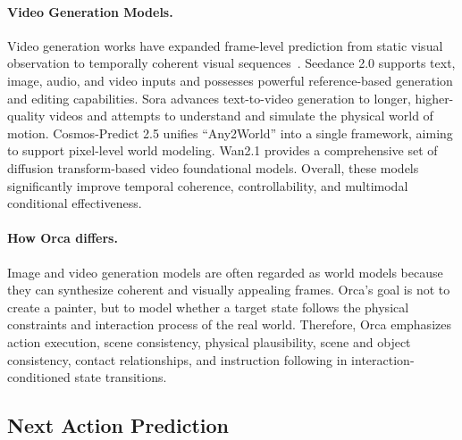 \documentclass{llmxive}
\begin{document}
\paragraph{Video Generation Models.}\label{sec:videogms}
Video generation works have expanded frame-level prediction from static visual observation to temporally coherent visual sequences~\citep{videoworld,VideoWorld-2,cognitive_map}. Seedance 2.0 \citep{seedance2.0} supports text, image, audio, and video inputs and possesses powerful reference-based generation and editing capabilities. Sora advances text-to-video generation to longer, higher-quality videos and attempts to understand and simulate the physical world of motion. Cosmos-Predict 2.5 \citep{cosmospredict2.5} unifies ``Any2World'' into a single framework, aiming to support pixel-level world modeling. Wan2.1 \citep{wan2.1} provides a comprehensive set of diffusion transform-based video foundational models. Overall, these models significantly improve temporal coherence, controllability, and multimodal conditional effectiveness.

\vspace{-0.5em}
\paragraph{How Orca differs.}
Image and video generation models are often regarded as world models because they can synthesize coherent and visually appealing frames.
Orca's goal is not to create a painter, but to model whether a target state follows the physical constraints and interaction process of the real world.
Therefore, Orca emphasizes action execution, scene consistency, physical plausibility, scene and object consistency, contact relationships, and instruction following in interaction-conditioned state transitions.

\vspace{-1em}
\subsection{Next Action Prediction}\label{sec:nap}
\end{document}

